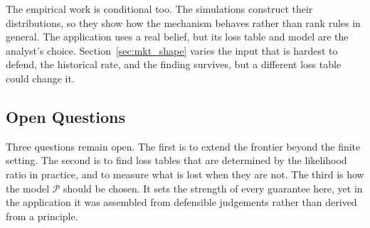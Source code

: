 The empirical work is conditional too. The simulations construct their
distributions, so they show how the mechanism behaves rather than rank rules
in general. The application uses a real belief, but its loss table and model
are the analyst's choice. Section~\ref{sec:mkt_shape} varies the input that is
hardest to defend, the historical rate, and the finding survives, but a
different loss table could change it.

\subsection{Open Questions}\label{sec:disc_open}

Three questions remain open. The first is to extend the frontier beyond the
finite setting. The second is to find loss tables that are determined by the
likelihood ratio in practice, and to measure what is lost when they are not.
The third is how the model $\mathcal P$ should be chosen. It sets the strength
of every guarantee here, yet in the application it was assembled from
defensible judgements rather than derived from a principle.
